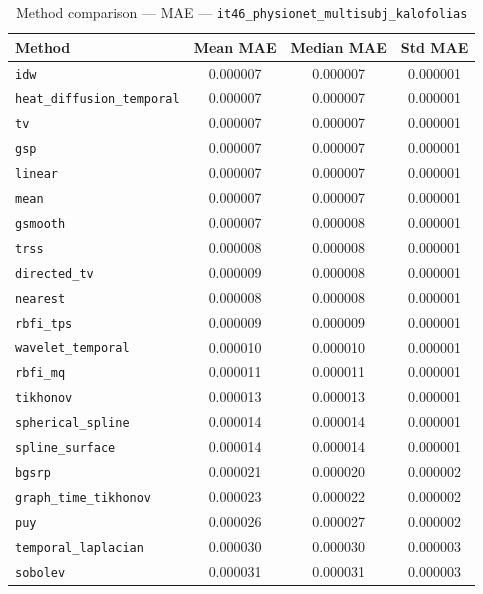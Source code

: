 \begin{table}[ht]
\centering
\caption{Method comparison — MAE — \texttt{it46_physionet_multisubj_kalofolias}}
\label{tab:mae_it46_physionet_multisubj_kalofolias}
\begin{tabular}{lccc}
\hline
Method & Mean MAE & Median MAE & Std MAE \\
\hline
\texttt{idw} & 0.000007 & 0.000007 & 0.000001 \\
\texttt{heat_diffusion_temporal} & 0.000007 & 0.000007 & 0.000001 \\
\texttt{tv} & 0.000007 & 0.000007 & 0.000001 \\
\texttt{gsp} & 0.000007 & 0.000007 & 0.000001 \\
\texttt{linear} & 0.000007 & 0.000007 & 0.000001 \\
\texttt{mean} & 0.000007 & 0.000007 & 0.000001 \\
\texttt{gsmooth} & 0.000007 & 0.000008 & 0.000001 \\
\texttt{trss} & 0.000008 & 0.000008 & 0.000001 \\
\texttt{directed_tv} & 0.000009 & 0.000008 & 0.000001 \\
\texttt{nearest} & 0.000008 & 0.000008 & 0.000001 \\
\texttt{rbfi_tps} & 0.000009 & 0.000009 & 0.000001 \\
\texttt{wavelet_temporal} & 0.000010 & 0.000010 & 0.000001 \\
\texttt{rbfi_mq} & 0.000011 & 0.000011 & 0.000001 \\
\texttt{tikhonov} & 0.000013 & 0.000013 & 0.000001 \\
\texttt{spherical_spline} & 0.000014 & 0.000014 & 0.000001 \\
\texttt{spline_surface} & 0.000014 & 0.000014 & 0.000001 \\
\texttt{bgsrp} & 0.000021 & 0.000020 & 0.000002 \\
\texttt{graph_time_tikhonov} & 0.000023 & 0.000022 & 0.000002 \\
\texttt{puy} & 0.000026 & 0.000027 & 0.000002 \\
\texttt{temporal_laplacian} & 0.000030 & 0.000030 & 0.000003 \\
\texttt{sobolev} & 0.000031 & 0.000031 & 0.000003 \\
\hline
\end{tabular}
\end{table}
